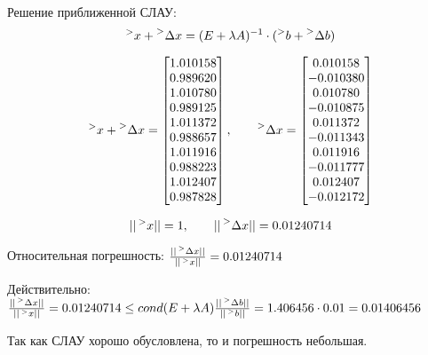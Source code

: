 \documentclass[14pt,a4paper]{scrartcl}
\begin{document}
Решение приближенной СЛАУ:
\begin{equation*}
	\prescript{>}{}{x} + \prescript{>}{}{\Delta x} = (E + \lambda A)^{-1} \cdot (\prescript{>}{}{b} + \prescript{>}{}{\Delta b})
\end{equation*}

\begin{equation*}
	\prescript{>}{}{x} + \prescript{>}{}{\Delta x} = 
	\begin{bmatrix}{}
	1.010158 \\ 
	0.989620 \\ 
	1.010780 \\ 
	0.989125 \\ 
	1.011372 \\ 
	0.988657 \\ 
	1.011916 \\ 
	0.988223 \\ 
	1.012407 \\ 
	0.987828 \\ 
	\end{bmatrix},
	\qquad 
	\prescript{>}{}{\Delta x} =
	\begin{bmatrix}{}
	0.010158 \\ 
	-0.010380 \\ 
	0.010780 \\ 
	-0.010875 \\ 
	0.011372 \\ 
	-0.011343 \\ 
	0.011916 \\ 
	-0.011777 \\ 
	0.012407 \\ 
	-0.012172 \\ 
	\end{bmatrix}
\end{equation*}


\begin{equation*}
	|| \prescript{>}{}{x} || = 1, \qquad || \prescript{>}{}{\Delta x} || = 0.01240714
\end{equation*}

Относительная погрешность: $\frac{|| \prescript{>}{}{\Delta x} ||}{|| \prescript{>}{}{x} ||} = 0.01240714$


Действительно:\\
 $\frac{|| \prescript{>}{}{\Delta x} ||}{|| \prescript{>}{}{x} ||} = 0.01240714 \leq cond(E + \lambda A) \frac{||\prescript{>}{}{\Delta b}||}{||\prescript{>}{}{b}||} = 1.406456 \cdot 0.01 = 0.01406456$

Так как СЛАУ хорошо обусловлена, то и погрешность небольшая.
\end{document}
